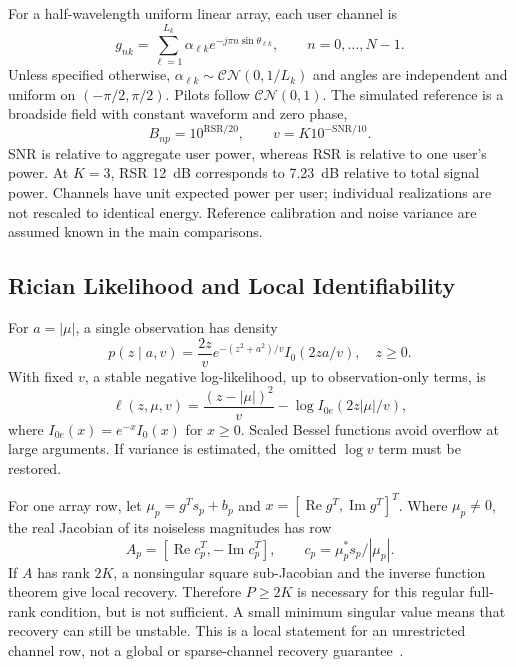 \documentclass[10pt,journal,letterpaper]{IEEEtran}
\newcommand{\CN}{\mathcal{CN}}
\begin{document}
For a half-wavelength uniform linear array, each user channel is
\begin{equation}
 g_{nk}=\sum_{\ell=1}^{L_k}\alpha_{\ell k}e^{-j\pi n\sin\theta_{\ell k}},
 \qquad n=0,\ldots,N-1.
 \label{eq:channel}
\end{equation}
Unless specified otherwise, $\alpha_{\ell k}\sim\CN(0,1/L_k)$ and angles are independent and uniform on $(-\pi/2,\pi/2)$. Pilots follow $\CN(0,1)$. The simulated reference is a broadside field with constant waveform and zero phase,
\begin{equation}
 B_{np}=10^{\mathrm{RSR}/20},\qquad v=K10^{-\mathrm{SNR}/10}.
\end{equation}
SNR is relative to aggregate user power, whereas RSR is relative to one user's power. At $K=3$, RSR 12~dB corresponds to 7.23~dB relative to total signal power. Channels have unit expected power per user; individual realizations are not rescaled to identical energy. Reference calibration and noise variance are assumed known in the main comparisons.

\subsection{Rician Likelihood and Local Identifiability}
For $a=|\mu|$, a single observation has density
\begin{equation}
 p(z\mid a,v)=\frac{2z}{v}e^{-(z^2+a^2)/v}I_0(2za/v),\quad z\ge0.
\end{equation}
With fixed $v$, a stable negative log-likelihood, up to observation-only terms, is
\begin{equation}
 \ell(z,\mu,v)=\frac{(z-|\mu|)^2}{v}-\log I_{0e}(2z|\mu|/v),
 \label{eq:loss}
\end{equation}
where $I_{0e}(x)=e^{-x}I_0(x)$ for $x\ge0$. Scaled Bessel functions avoid overflow at large arguments. If variance is estimated, the omitted $\log v$ term must be restored.

For one array row, let $\mu_p=g^Ts_p+b_p$ and $x=[\operatorname{Re}g^T,\operatorname{Im}g^T]^T$. Where $\mu_p\ne0$, the real Jacobian of its noiseless magnitudes has row
\begin{equation}
 A_p=[\operatorname{Re}c_p^T,-\operatorname{Im}c_p^T],\qquad
 c_p=\mu_p^*s_p/|\mu_p|.
 \label{eq:jacobian}
\end{equation}
If $A$ has rank $2K$, a nonsingular square sub-Jacobian and the inverse function theorem give local recovery. Therefore $P\ge2K$ is necessary for this regular full-rank condition, but is not sufficient. A small minimum singular value means that recovery can still be unstable. This is a local statement for an unrestricted channel row, not a global or sparse-channel recovery guarantee~\cite{gao2018}.
\end{document}
